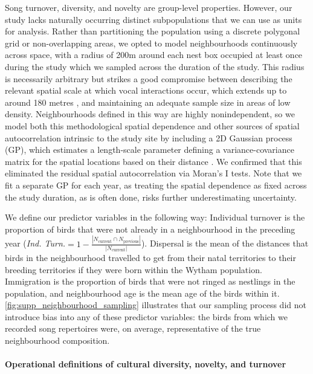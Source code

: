 Song turnover, diversity, and novelty are group-level properties. However, our study lacks naturally occurring distinct subpopulations that we can use as units for analysis. Rather than partitioning the population using a discrete polygonal grid or non-overlapping areas, we opted to model neighbourhoods continuously across space, with a radius of 200m around each nest box occupied at least once during the study \parencite{fayet2014} which we sampled across the duration of the study. This radius is necessarily arbitrary but strikes a good compromise between describing the relevant spatial scale at which vocal interactions occur, which extends up to around 180 metres \parencite{bircher2021, blumenrath2004}, and maintaining an adequate sample size in areas of low density. Neighbourhoods defined in this way are highly nonindependent, so we model both this methodological spatial dependence and other sources of spatial autocorrelation intrinsic to the study site by including a 2D Gaussian process (GP), which estimates a length-scale parameter defining a variance-covariance matrix for the spatial locations based on their distance \parencite{dearmon2016, gelfand2016, wright2021}. We confirmed that this eliminated the residual spatial autocorrelation via Moran's I tests. Note that we fit a separate GP for each year, as treating the spatial dependence as fixed across the study duration, as is often done, risks further underestimating uncertainty. 

We define our predictor variables in the following way: Individual turnover is the proportion of birds that were not already in a neighbourhood in the preceding year (\textit{Ind. Turn.}$ = 1 - \frac{|N_{\text{current}} \cap N_{\text{previous}}|}{|N_{\text{current}}|}$). Dispersal is the mean of the distances that birds in the neighbourhood travelled to get from their natal territories to their breeding territories if they were born within the Wytham population. Immigration is the proportion of birds that were not ringed as nestlings in the population, and neighbourhood age is the mean age of the birds within it. \autoref{fig:supp_neighbourhood_sampling} illustrates that our sampling process did not introduce bias into any of these predictor variables: the birds from which we recorded song repertoires were, on average, representative of the true neighbourhood composition.

\paragraph{Operational definitions of cultural diversity, novelty, and turnover}

